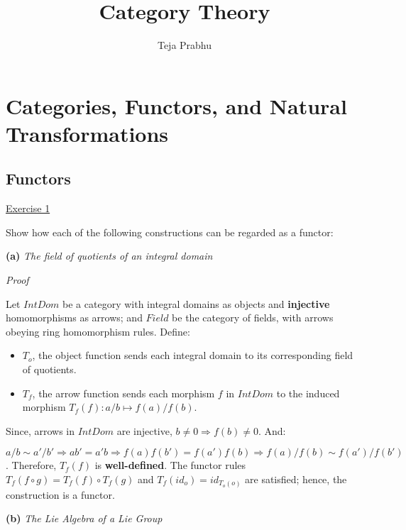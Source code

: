 \documentclass[11pt]{article}
\title{\textbf{Category Theory}}
\author{Teja Prabhu}
\date{}
\begin{document}
\maketitle
\newpage
\tableofcontents
\newpage

\section{Categories, Functors, and Natural Transformations}
\newpage

\subsection{Functors}

\underline{Exercise 1} 
\vspace{2mm}

Show how each of the following constructions can be regarded as a functor: 

\vspace{2mm}
\textbf{(a)} \emph{The field of quotients of an integral domain}
\vspace{2mm}

\noindent
\emph{Proof}

Let $IntDom$ be a category with integral domains as objects and \textbf{injective} homomorphisms as arrows; and $Field$ be the category of fields, with arrows obeying ring homomorphism rules. Define:

\begin{itemize}
    \item $T_o$, the object function sends each integral domain to its corresponding field of quotients. 
	\item $T_f$, the arrow function sends each morphism $f$ in $IntDom$ to the induced morphism $T_f(f) : a/b \longmapsto f(a) / f(b)$. 
\end{itemize}

Since, arrows in $IntDom$ are injective, $b \neq 0 \Longrightarrow f(b) \neq 0$. And:

$ a/b \sim a'/b' \Longrightarrow ab' = a'b \Longrightarrow f(a)f(b') = f(a')f(b) \Longrightarrow f(a)/f(b) \sim f(a')/f(b')$. Therefore, $T_f(f)$ is \textbf{well-defined}. The functor rules 
$T_f(f \circ g) = T_f(f) \circ T_f(g)$ and $T_f(id_o) = id_{T_o(o)}$ are satisfied; hence, the construction is a functor. 

\vspace{2mm}

\textbf{(b)} \emph{The Lie Algebra of a Lie Group}
\end{document}

